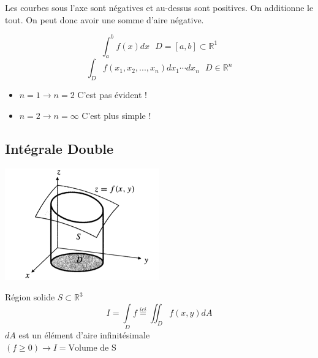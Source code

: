 \begin{myrem}

Les courbes sous l'axe sont négatives et au-dessus sont positives. On additionne le tout. On peut donc avoir une somme d'aire négative.

$$\int_{a}^{b} {f(x) dx} \textbf{        } D=[a,b] \subset \mathbb{R}^1$$
$$\int_D f(x_1,x_2,...,x_n)dx_1 \cdots dx_n \textbf{      } D \in \mathbb{R}^n$$
\begin{itemize}


\item $n=1 \to n=2$ C'est pas évident !
\item $n=2 \to n= \infty $ C'est plus simple !

\end{itemize}
\end{myrem}





\subsection{Intégrale Double}
\includegraphics[scale=1]{image3.png}






Région solide $ S \subset \mathbb{R}^3$
\[I=\int \limits_{D}f\overset{ici}{=}\iint_D f (x,y) dA\]
$dA$ est un élément d'aire infinitésimale
\\
$(f \ge 0) \to I = \text{Volume de S}$


